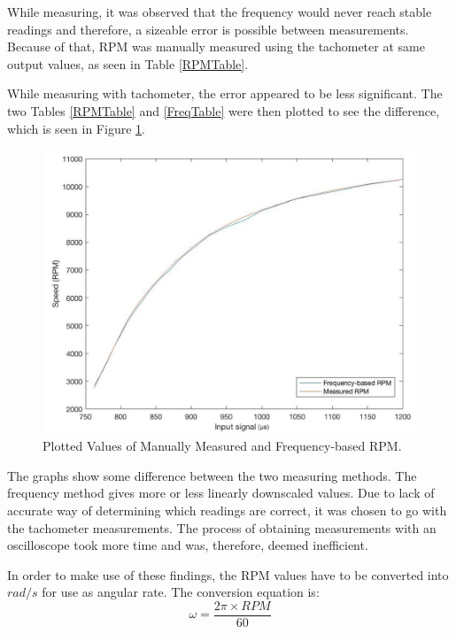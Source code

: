 While measuring, it was observed that the frequency would never reach stable readings and therefore, a sizeable error is possible between measurements. Because of that, RPM was manually measured using the tachometer at same output values, as seen in Table \ref{RPMTable}.

While measuring with tachometer, the error appeared to be less significant.
The two Tables \ref{RPMTable} and \ref{FreqTable} were then plotted to see the difference, which is seen in Figure \ref{RPMvsFreq}.

\begin{figure}[H]
  \centering
    \includegraphics[width=1\textwidth]{images/rpm66.jpg}
	\caption{Plotted Values of Manually Measured and Frequency-based RPM.}
	\label{RPMvsFreq}
\end{figure}

The graphs show some difference between the two measuring methods. The frequency method gives more or less linearly downscaled values. Due to lack of accurate way of determining which readings are correct, it was chosen to go with the tachometer measurements. The process of obtaining measurements with an oscilloscope took more time and was, therefore, deemed inefficient.

In order to make use of these findings, the RPM values have to be converted into $rad/s$ for use as angular rate. The conversion equation is:
\begin{equation}
\label{RPMConvert}
	\omega = \frac{2\pi \times RPM}{60}
\end{equation}

